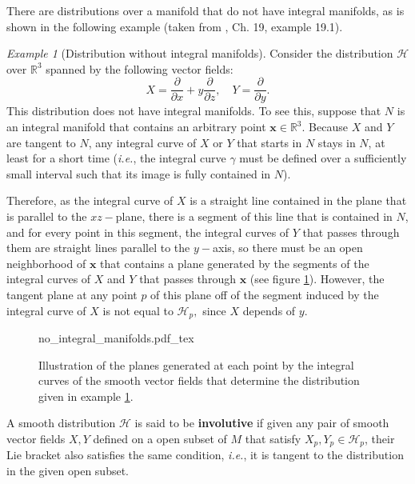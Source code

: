 \documentclass[12pt, letterpaper, reqno]{amsart}
\newcommand{\incfig}[2][1]{%
    \def\svgwidth{#1\columnwidth}
    {#2.pdf_tex}
}
\theoremstyle{definition}
\theoremstyle{plain}
\theoremstyle{remark}
\newtheorem{ex}{Example}
\begin{document}
There are distributions over a manifold that do not have integral manifolds, as is shown in the following example (taken from \cite{lee2003introduction}, Ch. 19, example 19.1).

\begin{ex}[Distribution without integral manifolds] \label{ex:no_integral_manifolds}
	Consider the distribution $ \mathcal{H} $ over $ \mathbb{R}^3 $ spanned by the following vector fields: 
	$$ X = \frac{\partial}{\partial x} + y \frac{\partial}{\partial z}, \quad Y = \frac{\partial}{\partial y}.  $$ 
	This distribution does not have integral manifolds. To see this, suppose that $ N $ is an integral manifold that contains an arbitrary point $ \textbf{x} \in \mathbb{R}^3.  $ Because $ X $ and $ Y $ are tangent to $ N $, any integral curve of $ X $ or $ Y $ that starts in $ N $ stays in $ N $, at least for a short time (\textit{i.e.}, the integral curve $ \gamma $ must be defined over a sufficiently small interval such that its image is fully contained in $ N $).   

	Therefore, as the integral curve of $ X $ is a straight line contained in the plane that is parallel to the $ xz- $plane, there is a segment of this line that is contained in $ N $, and for every point in this segment, the integral curves of $ Y $ that passes through them are straight lines parallel to the $ y- $axis, so there must be an open neighborhood of $ \textbf{x}  $ that contains a plane generated by the segments of the integral curves of $ X $ and $ Y $ that passes through $ \textbf{x}$ (see figure \ref{fig:no_integral_manifolds}). However, the tangent plane at any point $ p $  of this plane  off of the segment induced by the integral curve of $ X $ is not equal to $ \mathcal{H}_p, $ since $ X $ depends of $ y $.   
\end{ex}

\begin{figure}
    \centering
    \incfig{no_integral_manifolds}
    \caption{Illustration of the planes generated at each point by the integral curves of the smooth vector fields that determine the distribution given in example \ref{ex:no_integral_manifolds}.}
    \label{fig:no_integral_manifolds}
\end{figure}

A smooth distribution $ \mathcal{H} $ is said to be \textbf{involutive} if given any pair of smooth vector fields $ X,Y $ defined on a open subset of $ M $  that satisfy $X_p,Y_p\in \mathcal{H}_p $, their Lie bracket also satisfies the same condition, \textit{i.e.}, it is tangent to the distribution in the given open subset. 
\end{document}
